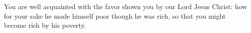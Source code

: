 
\lettrine{Y}{}ou are well acquainted with the favor shown you by our Lord Jesus Christ: how for your sake he made himself poor though he was rich, so that you might become rich by his poverty.